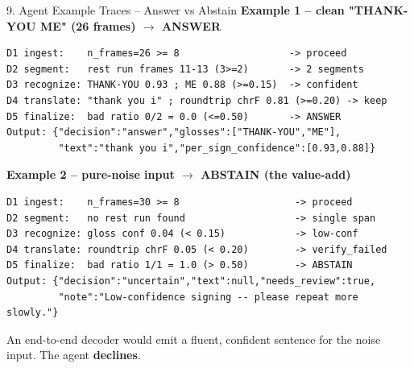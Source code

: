 \documentclass[10pt,aspectratio=169]{beamer}
\begin{document}
\begin{frame}[fragile]{9. Agent Example Traces -- Answer vs Abstain}
\textbf{Example 1 -- clean "THANK-YOU ME" (26 frames) $\rightarrow$ ANSWER}
\begin{lstlisting}[basicstyle=\ttfamily\tiny]
D1 ingest:    n_frames=26 >= 8                   -> proceed
D2 segment:   rest run frames 11-13 (3>=2)       -> 2 segments
D3 recognize: THANK-YOU 0.93 ; ME 0.88 (>=0.15)  -> confident
D4 translate: "thank you i" ; roundtrip chrF 0.81 (>=0.20) -> keep
D5 finalize:  bad ratio 0/2 = 0.0 (<=0.50)       -> ANSWER
Output: {"decision":"answer","glosses":["THANK-YOU","ME"],
         "text":"thank you i","per_sign_confidence":[0.93,0.88]}
\end{lstlisting}

\textbf{Example 2 -- pure-noise input $\rightarrow$ ABSTAIN (the value-add)}
\begin{lstlisting}[basicstyle=\ttfamily\tiny]
D1 ingest:    n_frames=30 >= 8                    -> proceed
D2 segment:   no rest run found                   -> single span
D3 recognize: gloss conf 0.04 (< 0.15)            -> low-conf
D4 translate: roundtrip chrF 0.05 (< 0.20)        -> verify_failed
D5 finalize:  bad ratio 1/1 = 1.0 (> 0.50)        -> ABSTAIN
Output: {"decision":"uncertain","text":null,"needs_review":true,
         "note":"Low-confidence signing -- please repeat more slowly."}
\end{lstlisting}

\scriptsize An end-to-end decoder would emit a fluent, confident sentence for the noise input. The agent \textbf{declines}.
\end{frame}
\end{document}
